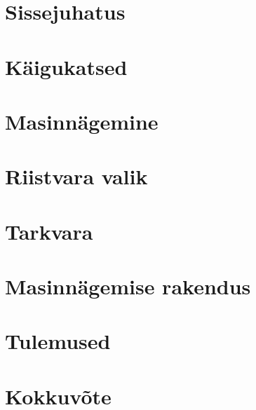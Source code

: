 
\chapter{Sissejuhatus}\label{chapter:introduction}


\chapter{Käigukatsed}\label{chapter:method}


\chapter{Masinnägemine}\label{chapter:method-vision}


\chapter{Riistvara valik}\label{chapter:hardware}


\chapter{Tarkvara}\label{chapter:software}


\chapter{Masinnägemise rakendus}\label{chapter:application}


\chapter{Tulemused}\label{chapter:results}


\chapter{Kokkuvõte}\label{chapter:summary}



